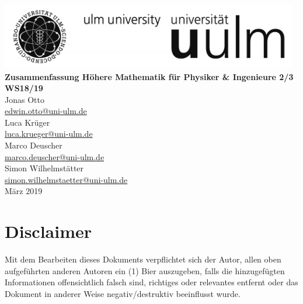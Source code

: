 \documentclass[a4paper]{report}
\begin{document}
\begin{titlepage}
    \centering
    \vfill
    \includegraphics[width=13cm]{UniUlmLogo.PNG} %
    \vfill
    \vfill
    {\bfseries\Large
        Zusammenfassung Höhere Mathematik für Physiker \& Ingenieure 2/3\\
        WS18/19\\
    }    
    \vskip2cm
        Jonas Otto\\ \href{mailto:edwin.otto@uni-ulm.de}{edwin.otto@uni-ulm.de}\\
        Luca Krüger\\ \href{luca.krueger@uni-ulm.de}{luca.krueger@uni-ulm.de}\\
        Marco Deuscher\\ \href{marco.deuscher@uni-ulm.de}{marco.deuscher@uni-ulm.de}\\
        Simon Wilhelmstätter\\ \href{simon.wilhelmstaetter@uni-ulm.de}{simon.wilhelmstaetter@uni-ulm.de}\\
        \vfill
     März 2019
    \vfill
    \vfill
    \vfill
\end{titlepage}

\clearpage



\tableofcontents
\newpage

\section*{Disclaimer}
Mit dem Bearbeiten dieses Dokuments verpflichtet sich der Autor, allen oben aufgeführten anderen Autoren ein (1) Bier auszugeben, falls die hinzugefügten Informationen offensichtlich falsch sind, richtiges oder relevantes entfernt oder das Dokument in anderer Weise negativ/destruktiv beeinflusst wurde.
\end{document}
